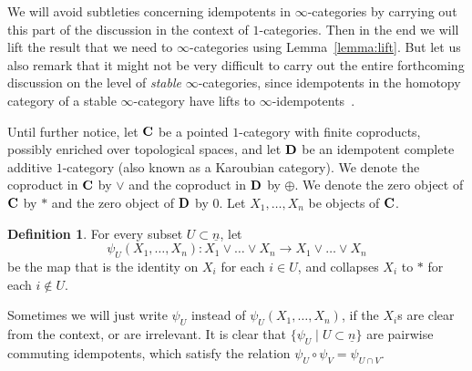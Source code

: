 \documentclass[psamsfonts]{amsart}
\theoremstyle{plain}
\theoremstyle{definition}
\newtheorem{defn}[thm]{Definition}
\theoremstyle{remark}
\newcommand{\catname}[1]{{\normalfont\textbf{#1}}}
\begin{document}

We will avoid subtleties concerning idempotents in $\infty$-categories by carrying out this part of the discussion in the context of $1$-categories. Then in the end we will lift the result that we need to $\infty$-categories using Lemma~\ref{lemma:lift}. But let us also remark that it might not be very difficult to carry out the entire forthcoming discussion on the level of \emph{stable} $\infty$-categories, since idempotents in the homotopy category of a stable $\infty$-category have lifts to $\infty$-idempotents~\cite[Lemma 1.2.4.6]{LurieHA}.

Until further notice, let $\catname{C}$ be a pointed $1$-category with finite coproducts, possibly enriched over topological spaces, and let $\catname{D}$ be an idempotent complete additive $1$-category (also known as a Karoubian category). We denote the coproduct in $\catname{C}$ by $\vee$ and the coproduct in $\catname{D}$ by $\oplus$. We denote the zero object of $\catname{C}$ by $*$ and the zero object of $\catname{D}$ by $0$. Let $X_1, \ldots, X_n$ be objects of $\catname{C}$.
\begin{defn}
For every subset $U\subset \underline{n}$, let 
\[
\psi_U(X_1, \ldots, X_n) \colon X_1 \vee\ldots\vee X_n\to X_1 \vee\ldots\vee X_n
\] 
be the map that is the identity on $X_i$ for each $i\in U$, and collapses $X_i$ to $*$ for each $i\not \in U$. 
\end{defn}
Sometimes we will just write $\psi_U$ instead of $\psi_U(X_1, \ldots, X_n)$, if the $X_i$s are clear from the context, or are irrelevant. 
It is clear that $\{\psi_U\mid U\subset \underline{n}\}$ are pairwise commuting idempotents, which satisfy the relation $\psi_U\circ \psi_V=\psi_{U\cap V}$.
\end{document}
